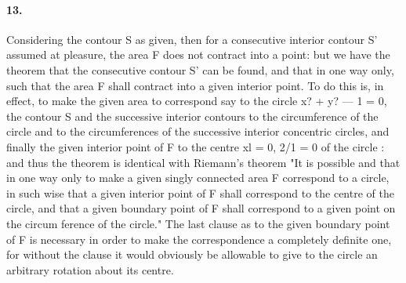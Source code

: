 \documentclass[11pt,a4paper]{book}
\begin{document}
{{{{{{\paragraph{13.} Considering   the   contour   S   as   given,   then    for   a   consecutive   interior    contour
S'   assumed   at   pleasure,   the   area    F    does    not    contract    into    a    point:    but    we    have
the    theorem    that    the    consecutive    contour    S'   can    be    found,   and    that    in   one   way
only,   such   that   the   area  F  shall   contract   into    a    given    interior    point.      To    do    this
is,   in   effect,   to   make   the   given   area   to   correspond    say   to   the   circle   x?  +  y?  ---  1  =  0,
the   contour   S  and   the   successive   interior   contours   to   the   circumference   of  the   circle
and   to   the   circumferences   of  the   successive   interior   concentric   circles,  and   finally  the
given   interior  point   of   F  to    the    centre    xl  =  0,    2/1  =  0    of    the    circle  :    and    thus    the
theorem    is    identical    with    Riemann's    theorem   "It    is    possible   and   that   in   one   way
only   to   make   a   given   singly   connected   area   F  correspond   to   a   circle,   in    such    wise
that   a   given   interior   point   of    F    shall   correspond    to    the    centre    of    the    circle,    and
that   a   given   boundary   point   of  F  shall   correspond   to   a   given   point   on   the   circum
ference    of    the    circle."      The    last    clause    as    to    the    given    boundary   point    of  F    is
necessary   in   order   to    make    the   correspondence   a   completely   definite   one,  for   without
the   clause   it    would   obviously   be   allowable   to   give    to  the  circle  an  arbitrary  rotation
about  its  centre.
}}}}}}
\end{document}

